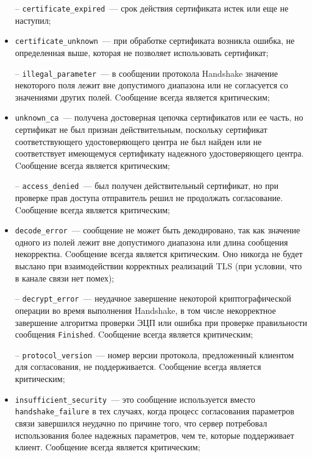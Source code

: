 \begin{itemize}
\item[--]
\lstinline{certificate_expired}~--- срок действия сертификата истек 
или еще не наступил; 

\item[--]
\lstinline{certificate_unknown}~--- при обработке сертификата 
возникла ошибка, не определенная выше, которая не позволяет использовать 
сертификат; 

\item[--]
\lstinline{illegal_parameter}~--- в сообщении протокола Handshake 
значение некоторого поля лежит вне допустимого диапазона или не 
согласуется со значениями других полей. Cообщение всегда является 
критическим; 

\item[--]
\lstinline{unknown_ca}~--- получена достоверная цепочка сертификатов 
или ее часть, но сертификат не был признан действительным, поскольку 
сертификат соответствующего удостоверяющего центра не был найден или не 
соответствует имеющемуся сертификату надежного удостоверяющего центра. 
Cообщение всегда является критическим; 

\item[--]
\lstinline{access_denied}~--- был получен действительный сертификат, 
но при проверке прав доступа отправитель решил не продолжать согласование. 
Cообщение всегда является критическим; 

\item[--]
\lstinline{decode_error}~--- сообщение не может быть декодировано, 
так как значение одного из полей лежит вне допустимого диапазона или длина 
сообщения некорректна. Cообщение всегда является критическим. Оно никогда 
не будет выслано при взаимодействии корректных реализаций TLS (при 
условии, что в канале связи нет помех); 

\item[--]
\lstinline{decrypt_error}~--- неудачное завершение некоторой 
криптографической операции во время выполнения Handshake, в том числе 
некорректное завершение алгоритма проверки ЭЦП или ошибка при проверке 
правильности сообщения \lstinline{Finished}. Cообщение всегда является критическим; 

\item[--]
\lstinline{protocol_version}~--- номер версии протокола, предложенный 
клиентом для согласования, не поддерживается. Cообщение всегда является 
критическим; 

\item[--]
\lstinline{insufficient_security}~--- это сообщение используется вместо 
\lstinline{handshake_failure} в тех случаях, когда процесс согласования  
параметров связи завершился неудачно по причине того, что сервер 
потребовал использования более надежных параметров, чем те, которые 
поддерживает клиент. Cообщение всегда является критическим; 


\end{itemize}

